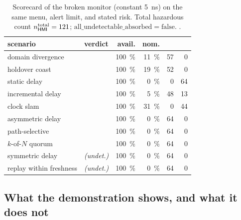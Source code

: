 \begin{table}[t]
  \centering
  \caption{Scorecard of the broken monitor (constant \SI{5}{\nano\second}) on the
  same menu, alert limit, and stated risk. Total hazardous count
  $n_{\textsf{HMI}{}}^{\text{total}}=121$;
  $\mathrm{all\_undetectable\_absorbed}=\text{false}$. \Modelled{}.}
  \label{tab:brokencard}
  \begin{tabular}{l l r r r r}
    \toprule
    scenario & verdict & avail. & nom. & \MI{} & \HMI{} \\
    \midrule
    domain divergence        & \CovPass{}                    & \SI{100}{\percent} & \SI{11}{\percent} & 57 & 0  \\
    holdover coast           & \CovPass{}                    & \SI{100}{\percent} & \SI{19}{\percent} & 52 & 0  \\
    static delay             & \CovFail{}                    & \SI{100}{\percent} & \SI{0}{\percent}  & 0  & 64 \\
    incremental delay        & \CovFail{}                    & \SI{100}{\percent} & \SI{5}{\percent}  & 48 & 13 \\
    clock slam               & \CovFail{}                    & \SI{100}{\percent} & \SI{31}{\percent} & 0  & 44 \\
    asymmetric delay         & \CovPass{}                    & \SI{100}{\percent} & \SI{0}{\percent}  & 64 & 0  \\
    path-selective           & \CovPass{}                    & \SI{100}{\percent} & \SI{0}{\percent}  & 64 & 0  \\
    $k$-of-$N$ quorum        & \CovPass{}                    & \SI{100}{\percent} & \SI{0}{\percent}  & 64 & 0  \\
    symmetric delay          & \Unabsorbed{} \emph{(undet.)} & \SI{100}{\percent} & \SI{0}{\percent}  & 64 & 0  \\
    replay within freshness  & \Unabsorbed{} \emph{(undet.)} & \SI{100}{\percent} & \SI{0}{\percent}  & 64 & 0  \\
    \bottomrule
  \end{tabular}
\end{table}

\subsection{What the demonstration shows, and what it does not}
\label{sec:demoscope}


